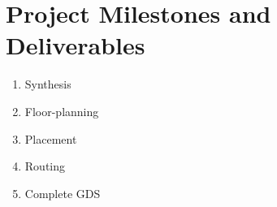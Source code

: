 
\chapter{Project Milestones and Deliverables}
\label{Chapter6}

\begin{enumerate}
    \item Synthesis
    \item Floor-planning
    \item Placement
    \item Routing
    \item Complete GDS
\end{enumerate}